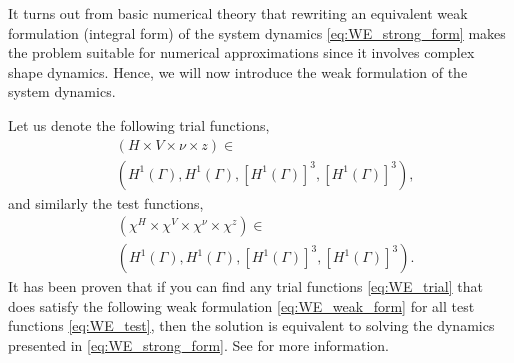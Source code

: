 It turns out from basic numerical theory that rewriting an equivalent weak formulation (integral form) of the system dynamics \eqref{eq:WE_strong_form} makes the problem suitable for numerical approximations since it involves complex shape dynamics.
Hence, we will now introduce the weak formulation of the system dynamics.

Let us denote the following trial functions,
\begin{equation}
\label{eq:WE_trial}
    \begin{split}
& ( H \times V \times \nu  \times z ) \in \\
&\left( H^{1}\left( \Gamma  \right), H^1 \left( \Gamma  \right), \left[ H^{1} \left( \Gamma  \right)  \right] ^3, \left[ H^{1}\left( \Gamma  \right)  \right]^3   \right),
    \end{split}
\end{equation}
and similarly the test functions,
\begin{equation}
\label{eq:WE_test}
    \begin{split}
& ( \chi^{H}  \times \chi ^{V} \times \chi ^{\nu }  \times \chi ^{z} ) \in \\
 &\left( H^{1}\left( \Gamma  \right), H^1 \left( \Gamma  \right), \left[ H^{1} \left( \Gamma  \right)  \right] ^3, \left[ H^{1}\left( \Gamma  \right)  \right]^3   \right).
    \end{split}
\end{equation}
 It has been proven that if you can find any trial functions \eqref{eq:WE_trial} that does satisfy the following weak formulation \eqref{eq:WE_weak_form} for all test functions \eqref{eq:WE_test}, then the solution is equivalent to solving the dynamics presented in \eqref{eq:WE_strong_form}. See \cite{kovacs2021convergent} for more information.

